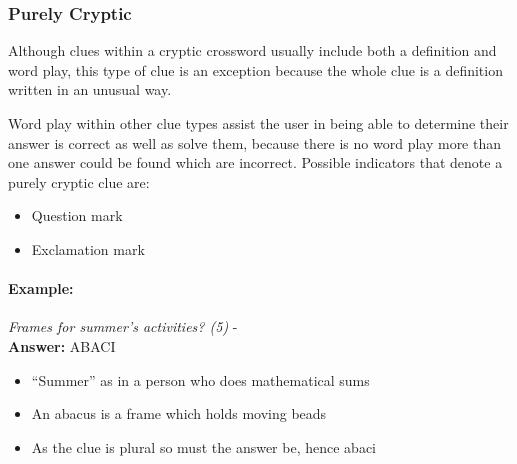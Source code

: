 \subsubsection{Purely Cryptic}

Although clues within a cryptic crossword usually include both a definition and
word play, this type of clue is an exception because the whole clue is a
definition written in an unusual way.

Word play within other clue types assist the user in being able to determine
their answer is correct as well as solve them, because there is no word play
more than one answer could be found which are incorrect. Possible indicators
that denote a purely cryptic clue are:

\begin{itemize} 
    \item Question mark 
    \item Exclamation mark
\end{itemize} 

\paragraph{Example:} \emph{Frames for summer's activities? (5)} - \citep{shuchiCryptic08} \\
\textbf{Answer:} ABACI 

\begin{itemize}
    \item ``Summer'' as in a person who does mathematical sums 
    \item An abacus is a frame which holds moving beads 
    \item As the clue is plural so must the answer be, hence abaci
\end{itemize}